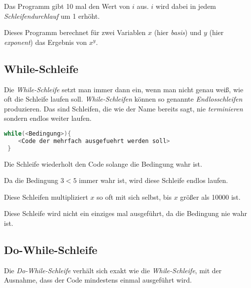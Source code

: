\documentclass[c_worksheet.tex]{subfiles}
\begin{document}
Das Programm gibt 10 mal den Wert von \(i\) aus. \(i\) wird dabei in jedem \emph{Schleifendurchlauf} um 1 erhöht.

 

Dieses Programm berechnet für zwei Variablen \(x\) (hier \emph{basis}) und \(y\) (hier \emph{exponent}) das Ergebnis von \(x^y\).


\subsection{While-Schleife}

Die \emph{While-Schleife} setzt man immer dann ein, wenn man nicht genau weiß, wie oft die Schleife laufen soll. \emph{While-Schleifen} können so genannte \emph{Endlosschleifen} produzieren. Das sind Schleifen, die wie der Name bereits sagt, nie \emph{terminieren} sondern endlos weiter laufen.

\begin{lstlisting}[language=c]
 while(<Bedingung>){
 	<Code der mehrfach ausgefuehrt werden soll>
 }
 \end{lstlisting}

 Die Schleife wiederholt den Code solange die Bedingung wahr ist.

  

 Da die Bedingung \( 3 < 5 \) immer wahr ist, wird diese Schleife endlos laufen.

  

 Diese Schleifen multipliziert \(x\) so oft mit sich selbst, bis \(x\) größer als 10000 ist.

 

Diese Schleife wird nicht ein einziges mal ausgeführt, da die Bedingung nie wahr ist.



\subsection{Do-While-Schleife}

Die \emph{Do-While-Schleife} verhält sich exakt wie die \emph{While-Schleife}, mit der Ausnahme, dass der Code mindestens einmal ausgeführt wird.
\end{document}
